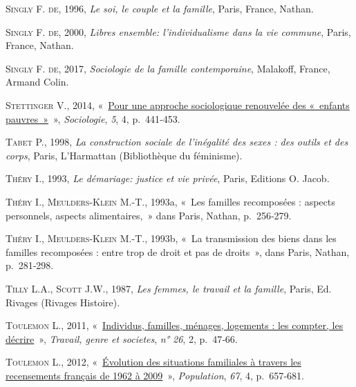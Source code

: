 \documentclass[
  12pt,
]{book}
\newlength{\cslhangindent}
\newenvironment{CSLReferences}[2] %
 {\begin{list}{}{%
  \setlength{\itemindent}{0pt}
  \setlength{\leftmargin}{0pt}
  \setlength{\parsep}{0pt}
  \ifodd #1
   \setlength{\leftmargin}{\cslhangindent}
   \setlength{\itemindent}{-1\cslhangindent}
  \fi
  \setlength{\itemsep}{#2\baselineskip}}}
 {\end{list}}
\begin{document}
\begin{CSLReferences}{0}{1}
\textsc{Singly F. de}, 1996, \emph{Le soi, le couple et la famille},
Paris, France, Nathan.

\textsc{Singly F. de}, 2000, \emph{Libres ensemble: l'individualisme
dans la vie commune}, Paris, France, Nathan.

\textsc{Singly F. de}, 2017, \emph{Sociologie de la famille
contemporaine}, Malakoff, France, Armand Colin.

\textsc{Stettinger V.}, 2014,
{«~\href{https://doi.org/10.3917/socio.054.0441}{Pour une approche
sociologique renouvelée des «~enfants pauvres~»}~»}, \emph{Sociologie},
\emph{5}, 4, p.~441‑453.

\textsc{Tabet P.}, 1998, \emph{La construction sociale de l'inégalité
des sexes : des outils et des corps}, Paris, L'Harmattan (Bibliothèque
du féminisme).

\textsc{Théry I.}, 1993, \emph{Le démariage: justice et vie privée},
Paris, Editions O. Jacob.

\textsc{Théry I.}, \textsc{Meulders-Klein M.-T.}, 1993a, {«~Les familles
recomposées : aspects personnels, aspects alimentaires,~»} dans Paris,
Nathan, p.~256‑279.

\textsc{Théry I.}, \textsc{Meulders-Klein M.-T.}, 1993b, {«~La
transmission des biens dans les familles recomposées : entre trop de
droit et pas de droits~»}, dans Paris, Nathan, p.~281‑298.

\textsc{Tilly L.A.}, \textsc{Scott J.W.}, 1987, \emph{Les femmes, le
travail et la famille}, Paris, Ed. Rivages (Rivages Histoire).

\textsc{Toulemon L.}, 2011,
{«~\href{https://www.cairn.info/revue-travail-genre-et-societes-2011-2-page-47.htm}{Individus,
familles, ménages, logements : les compter, les décrire}~»},
\emph{Travail, genre et societes}, \emph{n° 26}, 2, p.~47‑66.

\textsc{Toulemon L.}, 2012,
{«~\href{https://doi.org/10.3917/popu.1204.0657}{Évolution des
situations familiales à travers les recensements français de 1962 à
2009}~»}, \emph{Population}, \emph{67}, 4, p.~657‑681.


\end{CSLReferences}
\end{document}
